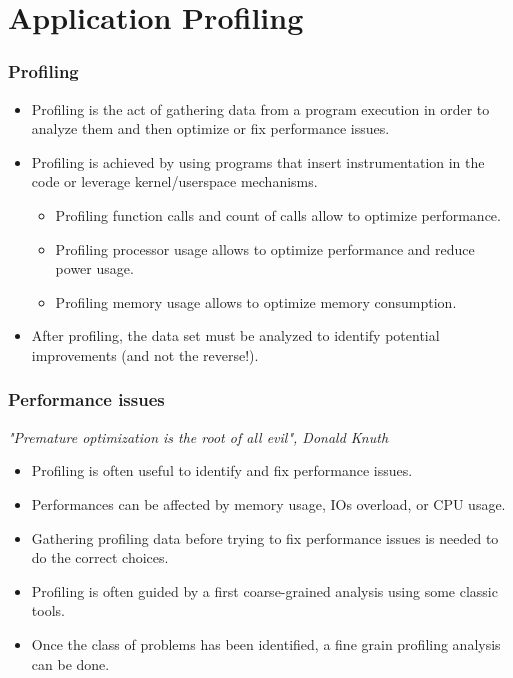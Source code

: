 \section{Application Profiling}

\begin{frame}
  \frametitle{Profiling}
  \begin{itemize}
    \item Profiling is the act of gathering data from a program execution in
          order to analyze them and then optimize or fix performance issues.
    \item Profiling is achieved by using programs that insert instrumentation
          in the code or leverage kernel/userspace mechanisms.
    \begin{itemize}
      \item Profiling function calls and count of calls allow to optimize
            performance.
      \item Profiling processor usage allows to optimize performance and
            reduce power usage.
      \item Profiling memory usage allows to optimize memory consumption.
    \end{itemize}
    \item After profiling, the data set must be analyzed to identify potential
          improvements (and not the reverse!).
  \end{itemize}
\end{frame}

\begin{frame}
  \frametitle{Performance issues}
  \begin{center}
    \vspace{0.2cm}
    \em{"Premature optimization is the root of all evil", Donald Knuth}
  \end{center}
  \begin{itemize}
    \item Profiling is often useful to identify and fix performance issues.
    \item Performances can be affected by memory usage, IOs overload, or
          CPU usage.
    \item Gathering profiling data before trying to fix performance issues is
          needed to do the correct choices.
    \item Profiling is often guided by a first coarse-grained analysis using
          some classic tools.
    \item Once the class of problems has been identified, a fine grain
          profiling analysis can be done.
  \end{itemize}
\end{frame}

